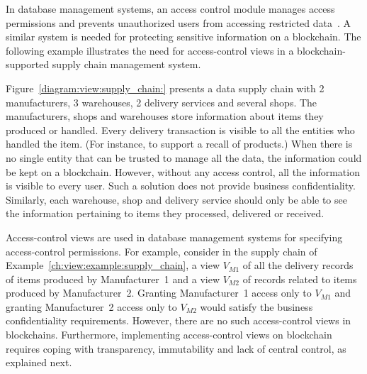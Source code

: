 In database management systems, an access control module manages access permissions and prevents unauthorized users from accessing restricted data~\cite{gertz2007handbook}. A similar
system is needed for protecting sensitive information on a blockchain. 
The following example illustrates the need for access-control views in a blockchain-supported supply chain management system. 
\begin{example}
\label{ch:view:example:supply_chain}
Figure~\ref{diagram:view:supply_chain:} presents a data supply chain with 2 manufacturers, 3 warehouses, 2 delivery services and several shops. The manufacturers, shops and warehouses store information about items they produced or handled. Every delivery transaction is visible to all the entities who handled the item. 
(For instance, to support a recall of products.)
When there is no single entity that can be trusted to manage all the data, the information could be kept on a blockchain. However, without any access control, all the information is visible to every user. Such a solution does not provide business confidentiality.
Similarly, each warehouse, shop and delivery service should only be able to see the information pertaining to items they processed, delivered or received. 
\end{example}

Access-control views are used in database management systems for specifying access-control permissions. For example, consider in the supply chain of Example~\ref{ch:view:example:supply_chain}, a view $V_{M1}$ of all the delivery records of items produced by Manufacturer~1 and a view $V_{M2}$ of records related to items produced by Manufacturer~2. Granting Manufacturer~1 access only to $V_{M1}$ and granting Manufacturer~2 access only to $V_{M2}$ would satisfy the business confidentiality requirements. However, there are no such access-control views in blockchains. Furthermore, implementing access-control views on blockchain requires coping with transparency, immutability and  lack of central control, as explained next.

